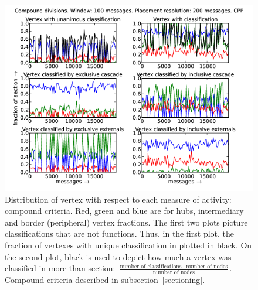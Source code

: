 \documentclass[%
 aip,
 jmp,%
 amsmath,amssymb,
 reprint,%
]{revtex4-1}
\begin{document}
\begin{figure}[hbtp] 
   \centering
        \includegraphics[width=\textwidth]{figs/CPP/100_2}
    \caption{Distribution of vertex with respect to each measure of activity: compound criteria. Red, green and blue are for hubs, intermediary and border (peripheral) vertex fractions. The first two plots picture classifications that are not functions. Thus, in the first plot, the fraction of vertexes with unique classification in plotted in black. On the second plot, black is used to depict how much a vertex was classified in more than section: $\frac{\text{number of classifications} - \text{number of nodes}}{\text{number of nodes}}$. Compound criteria described in subsection~\ref{sectioning}.}
    \label{fig:cpp100_}
\end{figure}
\end{document}
